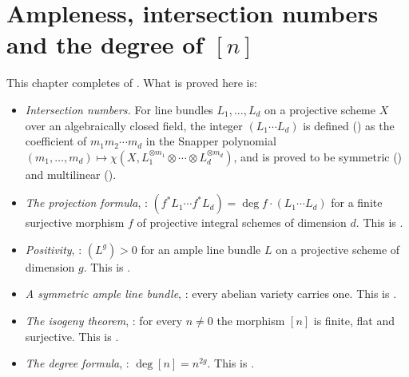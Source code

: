 %
%
%

\chapter{Ampleness, intersection numbers and the degree of $[n]$}
\label{chap:deg}

This chapter completes  of .  What is
proved here is:

\begin{itemize}
  \item \emph{Intersection numbers.}  For line bundles $L_1,\dots,L_d$ on a
  projective scheme $X$ over an algebraically closed field, the integer
  $(L_1\cdots L_d)$ is defined () as the coefficient
  of $m_1m_2\cdots m_d$ in the Snapper polynomial
  $(m_1,\dots,m_d)\mapsto\chi(X,L_1^{\otimes m_1}\otimes\cdots\otimes
  L_d^{\otimes m_d})$, and is proved to be symmetric
  () and multilinear
  ().
  \item \emph{The projection formula},
  : $(f^*L_1\cdots f^*L_d)=\deg
  f\cdot(L_1\cdots L_d)$ for a finite surjective morphism $f$ of projective
  integral schemes of dimension $d$.  This is
  .
  \item \emph{Positivity}, : $(L^g)>0$ for an
  ample line bundle $L$ on a projective scheme of dimension $g$.  This is
  .
  \item \emph{A symmetric ample line bundle},
  : every abelian variety carries one.  This is
  .
  \item \emph{The isogeny theorem}, : for every $n\neq0$
  the morphism $[n]$ is finite, flat and surjective.  This is
  .
  \item \emph{The degree formula}, :
  $\deg[n]=n^{2g}$.  This is .
\end{itemize}

